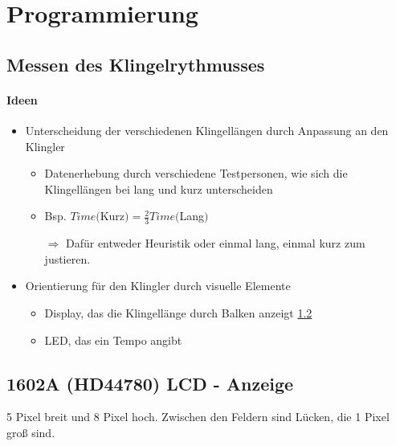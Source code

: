 \documentclass{scrartcl}
\begin{document}
\newpage

%
%

\section{Programmierung}\label{sec:soft}



\subsection{Messen des Klingelrythmusses}\label{ssec:mess}

\paragraph{Ideen}
\begin{itemize}
\item Unterscheidung der verschiedenen Klingellängen durch Anpassung an den Klingler
\begin{itemize}
\item Datenerhebung durch verschiedene Testpersonen, wie sich die Klingellängen bei lang und kurz unterscheiden
\item Bsp. $Time($Kurz$) = \frac{2}{3} Time($Lang$)$
\item[$\Rightarrow$] Dafür entweder Heuristik oder einmal lang, einmal kurz zum justieren.
\end{itemize}
\item Orientierung für den Klingler durch visuelle Elemente
\begin{itemize}
\item Display, das die Klingellänge durch Balken anzeigt \ref{ssec:lcd}
\item LED, das ein Tempo angibt
\end{itemize}
\end{itemize}



\subsection{1602A (HD44780) LCD - Anzeige}\label{ssec:lcd} 


5 Pixel breit und 8 Pixel hoch. Zwischen den Feldern sind Lücken, die 1 Pixel groß sind.
\end{document}
